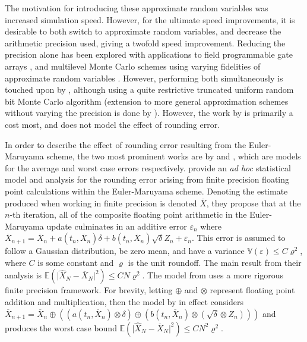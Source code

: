 \documentclass[manuscript,review]{acmart}
\begin{document}
The motivation for introducing these approximate random variables was increased simulation speed. However, for the ultimate speed improvements, it is desirable to both switch to approximate random variables, and decrease the arithmetic precision used, giving a twofold speed improvement. Reducing the precision alone has been explored with applications to field programmable gate arrays  \citep{brugger2014mixed,omland2015exploiting,omland2016mixed,chow2012mixed}, and multilevel Monte Carlo schemes using varying fidelities of approximate random variables \citep{muller1958inverse}. However, performing both simultaneously is touched upon by \citet{giles2019random_multilevel}, although using a quite restrictive truncated uniform random bit Monte Carlo algorithm (extension to more general approximation schemes without varying the precision is done by \citet{giles2020approximate}). However, the work by \citet{giles2019random_multilevel} is primarily a cost most, and does not model the effect of rounding error. 


In order to describe the effect of rounding error resulting from the Euler-Maruyama scheme, the two most prominent works are by \citet{arciniega2003rounding} and \citet{omland2016mixed}, which are models for the average and worst case errors respectively. \citet{arciniega2003rounding} provide an \textit{ad hoc} statistical model and analysis for the rounding error arising from finite precision floating point calculations within the Euler-Maruyama scheme. Denoting the estimate produced when working in finite precision is denoted $ \overline{X} $, they propose that at the $ n $-th iteration, all of the composite floating point arithmetic in the Euler-Maruyama update culminates in an additive error $ \varepsilon_n $ where
$ \overline{X}_{n+1} = \overline{X}_n + a(t_n, \overline{X}_n) \delta + b(t_n, \overline{X}_n)\sqrt{\delta} Z_n + \varepsilon_n $.
This error is assumed to follow a Gaussian distribution, be zero mean, and have a variance $ \mathbb{V}(\varepsilon) \leq C \varrho^2 $, where $ C $ is some constant and $ \varrho $ is the unit roundoff. The main result from their analysis \citep[theorem~2.2]{arciniega2003rounding} is $ \mathbb{E}(\lvert \widehat{X}_N - \overline{X}_N \rvert^2) \leq  CN\varrho^2 $. The model from \citet{omland2016mixed} uses a more rigorous finite precision framework. For brevity, letting $ \oplus $ and $ \otimes $ represent floating point addition and multiplication, then the model by \citet{omland2016mixed} in effect considers $ \overline{X}_{n+1} = \overline{X}_n \oplus ((a(t_n, \overline{X}_n) \otimes \delta) \oplus (b(t_n, \overline{X}_n)\otimes (\sqrt{\delta}\otimes Z_n))) $ and produces the worst case bound $ \mathbb{E}(\lvert \widehat{X}_N - \overline{X}_N \rvert^2) \leq  CN^2\varrho^2 $.
\end{document}
